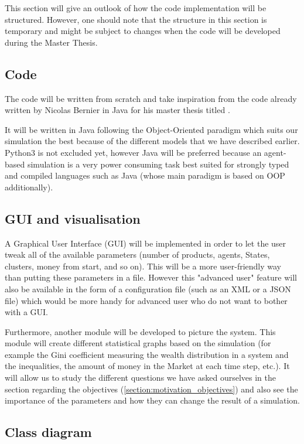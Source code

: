 This section will give an outlook of how the code implementation will be structured. However, one should note that the structure in this section is temporary and might be subject to changes when the code will be developed during the Master Thesis.

\subsection{Code}
The code will be written from scratch and take inspiration from the code already written by Nicolas Bernier in Java for his master thesis titled  \cite{nicolasbernier}.

It will be written in Java following the Object-Oriented paradigm which suits our simulation the best because of the different models that we have described earlier. Python3 is not excluded yet, however Java will be preferred because an agent-based simulation is a very power consuming task best suited for strongly typed and compiled languages such as Java (whose main paradigm is based on OOP additionally).

\subsection{GUI and visualisation}
A Graphical User Interface (GUI) will be implemented in order to let the user tweak all of the available parameters (number of products, agents, States, clusters, money from start, and so on). This will be a more user-friendly way than putting these parameters in a file. However this "advanced user" feature will also be available in the form of a configuration file (such as an XML or a JSON file) which would be more handy for advanced user who do not want to bother with a GUI.

Furthermore, another module will be developed to picture the system. This module will create different statistical graphs based on the simulation (for example the Gini coefficient measuring the wealth distribution in a system and the inequalities, the amount of money in the Market at each time step, etc.). It will allow us to study the different questions we have asked ourselves in the section regarding the objectives (\ref{section:motivation_objectives}) and also see the importance of the parameters and how they can change the result of a simulation.

\subsection{Class diagram}

